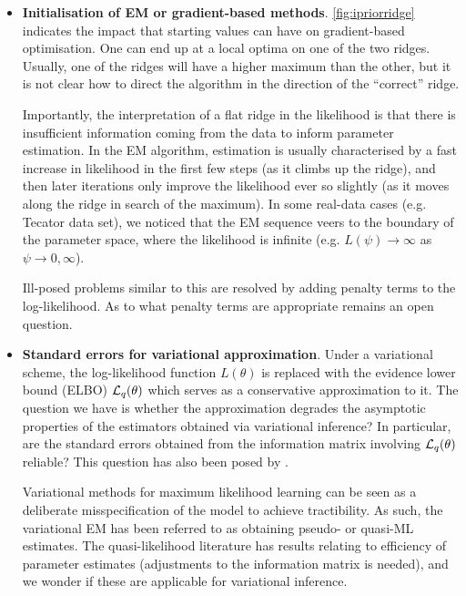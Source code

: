\documentclass[showframe,11pt,twoside,openright]{report}
\begin{document}
\begin{itemize}
  \item \textbf{Initialisation of EM or gradient-based methods}.
  \cref{fig:ipriorridge}  indicates the impact that starting values can have on gradient-based optimisation.
  One can end up at a local optima on one of the two ridges.
  Usually, one of the ridges will have a higher maximum than the other, but it is not clear how to direct the algorithm in the direction of the ``correct'' ridge.
  
  Importantly, the interpretation of a flat ridge in the likelihood is that there is insufficient information coming  from the data to inform parameter estimation.
  In the EM algorithm, estimation is usually characterised by a fast increase in likelihood in the first few steps (as it climbs up the ridge), and then later iterations only improve the likelihood ever so slightly (as it moves along the ridge in search of the maximum).
  In some real-data cases (e.g. Tecator data set), we noticed that the EM sequence veers to the boundary of the parameter space, where the likelihood is infinite (e.g. $L(\psi) \to \infty$ as $\psi\to 0,\infty$).
  
  Ill-posed problems similar to this are resolved by adding penalty terms to the log-likelihood.
  As to what penalty terms are appropriate remains an open question.
  
  \item \textbf{Standard errors for variational approximation}. 
  Under a variational scheme, the log-likelihood function $L(\theta)$ is replaced with the evidence lower bound (ELBO) ${\mathcal L}_q(\theta)$ which serves as a  conservative approximation to it. 
  The question we have is whether the approximation degrades the asymptotic properties of the estimators obtained via variational inference?
  In particular, are the standard errors obtained from the information matrix involving ${\mathcal L}_q(\theta)$ reliable?
  This question has also been posed by \citet{hall2011asymptotic,bickel2013asymptotic,chen2017use}.
  
  Variational methods for maximum likelihood learning can be seen as a deliberate misspecification of the model to achieve tractibility. 
  As such, the variational EM has been referred to as obtaining pseudo- or quasi-ML estimates.
  The quasi-likelihood literature has results relating to efficiency of parameter estimates (adjustments to the information matrix is needed), and we wonder if these are applicable for variational inference.
  

\end{itemize}
\end{document}
